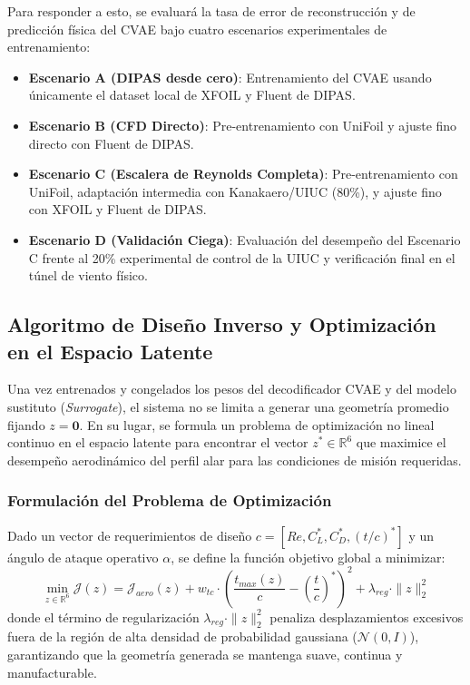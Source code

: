 \begin{enumerate}
Para responder a esto, se evaluará la tasa de error de reconstrucción y de predicción física del CVAE bajo cuatro escenarios experimentales de entrenamiento:
\begin{itemize}
    \item \textbf{Escenario A (DIPAS desde cero)}: Entrenamiento del CVAE usando únicamente el dataset local de XFOIL y Fluent de DIPAS.
    \item \textbf{Escenario B (CFD Directo)}: Pre-entrenamiento con UniFoil y ajuste fino directo con Fluent de DIPAS.
    \item \textbf{Escenario C (Escalera de Reynolds Completa)}: Pre-entrenamiento con UniFoil, adaptación intermedia con Kanakaero/UIUC (80\%), y ajuste fino con XFOIL y Fluent de DIPAS.
    \item \textbf{Escenario D (Validación Ciega)}: Evaluación del desempeño del Escenario C frente al 20\% experimental de control de la UIUC y verificación final en el túnel de viento físico.
\end{itemize}

\subsection{Algoritmo de Diseño Inverso y Optimización en el Espacio Latente}
\label{subsec:optimizacion_latente}

Una vez entrenados y congelados los pesos del decodificador CVAE y del modelo sustituto (\textit{Surrogate}), el sistema no se limita a generar una geometría promedio fijando $z = \mathbf{0}$. En su lugar, se formula un problema de optimización no lineal continuo en el espacio latente para encontrar el vector $z^* \in \mathbb{R}^6$ que maximice el desempeño aerodinámico del perfil alar para las condiciones de misión requeridas.

\subsubsection{Formulación del Problema de Optimización}
Dado un vector de requerimientos de diseño $c = [Re, C_L^*, C_D^*, (t/c)^*]$ y un ángulo de ataque operativo $\alpha$, se define la función objetivo global a minimizar:
\begin{equation}
    \min_{z \in \mathbb{R}^6} \mathcal{J}(z) = \mathcal{J}_{aero}(z) + w_{tc} \cdot \left( \frac{t_{max}(z)}{c} - \left(\frac{t}{c}\right)^* \right)^2 + \lambda_{reg} \cdot \|z\|_2^2
\end{equation}
donde el término de regularización $\lambda_{reg} \cdot \|z\|_2^2$ penaliza desplazamientos excesivos fuera de la región de alta densidad de probabilidad gaussiana ($\mathcal{N}(0, I)$), garantizando que la geometría generada se mantenga suave, continua y manufacturable.


\end{enumerate}
